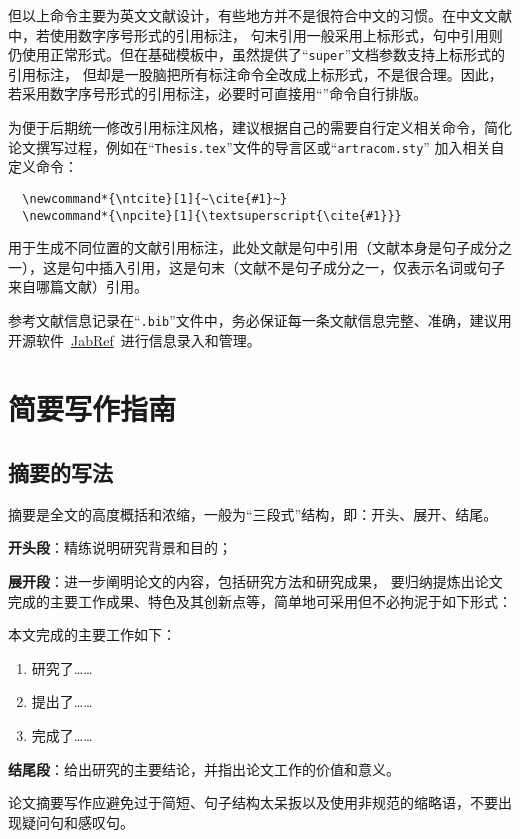 但以上命令主要为英文文献设计，有些地方并不是很符合中文的习惯。在中文文献中，若使用数字序号形式的引用标注，
句末引用一般采用上标形式，句中引用则仍使用正常形式。但在基础模板中，虽然提供了“\texttt{super}”文档参数支持上标形式的引用标注，
但却是一股脑把所有标注命令全改成上标形式，不是很合理。因此，若采用数字序号形式的引用标注，必要时可直接用“”命令自行排版。

为便于后期统一修改引用标注风格，建议根据自己的需要自行定义相关命令，简化论文撰写过程，例如在“\texttt{Thesis.tex}”文件的导言区或“\texttt{artracom.sty}”
加入相关自定义命令：{\linespread{1.1}
\begin{verbatim}
  \newcommand*{\ntcite}[1]{~\cite{#1}~}
  \newcommand*{\npcite}[1]{\textsuperscript{\cite{#1}}}
\end{verbatim}}
用于生成不同位置的文献引用标注，此处文献是句中引用（文献本身是句子成分之一），这是句中插入引用，这是句末（文献不是句子成分之一，仅表示名词或句子来自哪篇文献）引用。

参考文献信息记录在“\texttt{.bib}”文件中，务必保证每一条文献信息完整、准确，建议用开源软件~\href{https://www.jabref.org/}{JabRef}~进行信息录入和管理。

\section{简要写作指南}

\subsection{摘要的写法}

摘要是全文的高度概括和浓缩，一般为“三段式”结构，即：开头、展开、结尾。

\textbf{开头段}：精练说明研究背景和目的；

\textbf{展开段}：进一步阐明论文的内容，包括研究方法和研究成果，
要归纳提炼出论文完成的主要工作成果、特色及其创新点等，简单地可采用但不必拘泥于如下形式：

本文完成的主要工作如下：
\begin{enumerate}
\item 研究了……
\item 提出了……
\item 完成了……
\end{enumerate}

\textbf{结尾段}：给出研究的主要结论，并指出论文工作的价值和意义。

论文摘要写作应避免过于简短、句子结构太呆扳以及使用非规范的缩略语，不要出现疑问句和感叹句。

